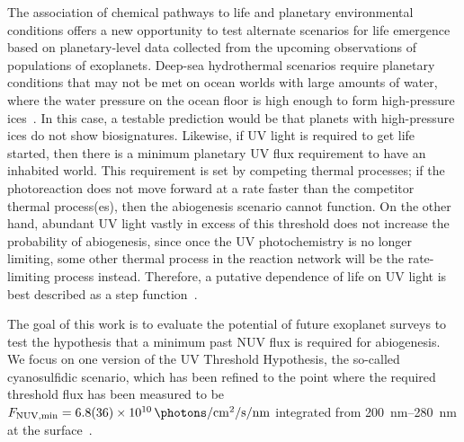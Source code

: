 \documentclass[twocolumn,twocolappendix,linenumbers]{aastex631}
\begin{document}
The association of chemical pathways to life and planetary environmental conditions offers a new opportunity to test alternate scenarios for life emergence based on planetary-level data collected from the upcoming observations of populations of exoplanets.
Deep-sea hydrothermal scenarios require planetary conditions that may not be met on ocean worlds with large amounts of water, where the water pressure on the ocean floor is high enough to form high-pressure ices~\citep{Noack2016,Kite2018}.  %
In this case, a testable prediction would be that planets with high-pressure ices do not show biosignatures.
Likewise, if UV light is required to get life started, then there is a minimum planetary UV flux requirement to have an inhabited world.
This requirement is set by competing thermal processes; if the photoreaction does not move forward at a rate faster than the competitor thermal process(es), then the abiogenesis scenario cannot function.
On the other hand, abundant UV light vastly in excess of this threshold does not increase the probability of abiogenesis, since once the UV photochemistry is no longer limiting, some other thermal process in the reaction network will be the rate-limiting process instead.
Therefore, a putative dependence of life on UV light is best described as a step function~\citep[e.g.,][]{Ranjan2017c,Rimmer2018,Rimmer2021}.

The goal of this work is to evaluate the potential of future exoplanet surveys to test the hypothesis that a minimum past NUV flux is required for abiogenesis.
We focus on one version of the UV Threshold Hypothesis, the so-called cyanosulfidic scenario, which has been refined to the point where the required threshold flux has been measured to be $F_\mathrm{NUV, min} = \SI{6.8\pm3.6 e10}{\photons\per\centi\meter\squared\per\second\per\nano\meter}$ integrated from \SIrange{200}{280}{\nano\meter} at the surface~\citep{Rimmer2018,Rimmer2021a,Rimmer2023,Ranjan2023a}.
\end{document}
